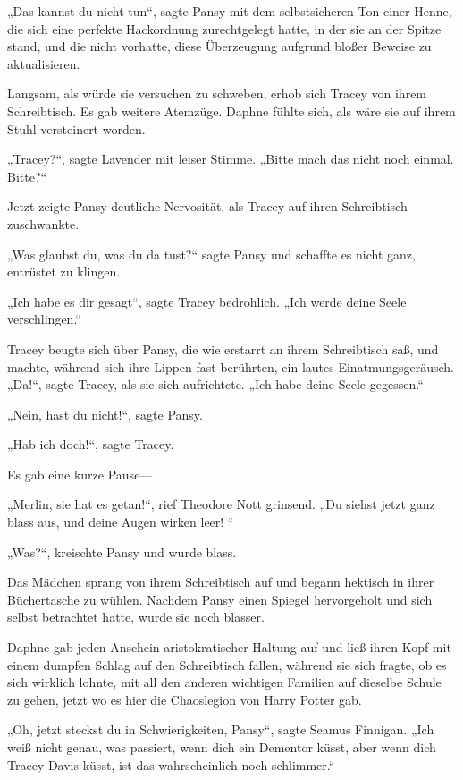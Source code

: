 {„Das kannst du nicht tun“, sagte Pansy mit dem selbstsicheren Ton einer Henne, die sich eine perfekte Hackordnung zurechtgelegt hatte, in der sie an der Spitze stand, und die nicht vorhatte, diese Überzeugung aufgrund bloßer Beweise zu aktualisieren.

Langsam, als würde sie versuchen zu schweben, erhob sich Tracey von ihrem Schreibtisch. Es gab weitere Atemzüge. Daphne fühlte sich, als wäre sie auf ihrem Stuhl versteinert worden.

„Tracey?“, sagte Lavender mit leiser Stimme. „Bitte mach das nicht noch einmal. Bitte?“

Jetzt zeigte Pansy deutliche Nervosität, als Tracey auf ihren Schreibtisch zuschwankte.

„Was glaubst du, was du da tust?“ sagte Pansy und schaffte es nicht ganz, entrüstet zu klingen.

„Ich habe es dir gesagt“, sagte Tracey bedrohlich. „Ich werde deine Seele verschlingen.“

Tracey beugte sich über Pansy, die wie erstarrt an ihrem Schreibtisch saß, und machte, während sich ihre Lippen fast berührten, ein lautes Einatmungsgeräusch. „Da!“, sagte Tracey, als sie sich aufrichtete. „Ich habe deine Seele gegessen.“

„Nein, hast du nicht!“, sagte Pansy.

„Hab ich doch!“, sagte Tracey.

Es gab eine kurze Pause—

„Merlin, sie hat es getan!“, rief Theodore Nott grinsend. „Du siehst jetzt ganz blass aus, und deine Augen wirken leer! “

„Was?“, kreischte Pansy und wurde blass.

Das Mädchen sprang von ihrem Schreibtisch auf und begann hektisch in ihrer Büchertasche zu wühlen. Nachdem Pansy einen Spiegel hervorgeholt und sich selbst betrachtet hatte, wurde sie noch blasser.

Daphne gab jeden Anschein aristokratischer Haltung auf und ließ ihren Kopf mit einem dumpfen Schlag auf den Schreibtisch fallen, während sie sich fragte, ob es sich wirklich lohnte, mit all den anderen wichtigen Familien auf dieselbe Schule zu gehen, jetzt wo es hier die Chaoslegion von Harry Potter gab.

„Oh, jetzt steckst du in Schwierigkeiten, Pansy“, sagte Seamus Finnigan. „Ich weiß nicht genau, was passiert, wenn dich ein Dementor küsst, aber wenn dich Tracey Davis küsst, ist das wahrscheinlich noch schlimmer.“

}
